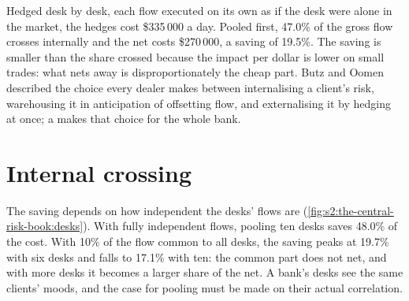 Hedged desk by desk, each flow executed on its own as if the desk were alone in the market, the hedges cost \$335\,000 a day. Pooled first, 47.0\% of the
gross flow crosses internally and the net costs \$270\,000, a saving of 19.5\%. The saving is smaller than the share crossed because the impact per
dollar is lower on small trades: what nets away is disproportionately the cheap part. Butz and Oomen described the choice every dealer makes between
internalising a client's risk, warehousing it in anticipation of offsetting flow, and externalising it by hedging at once; a  makes
that choice for the whole bank.

\section{Internal crossing}

The saving depends on how independent the desks' flows are (\cref{fig:s2:the-central-risk-book:desks}). With fully independent flows, pooling ten desks
saves 48.0\% of the cost. With 10\% of the flow common to all desks, the saving peaks at 19.7\% with six desks and falls to 17.1\% with ten: the common
part does not net, and with more desks it becomes a larger share of the net. A bank's desks see the same clients' moods, and the case for pooling must
be made on their actual correlation.

\begin{omfigure}

\label{fig:s2:the-central-risk-book:desks}
\end{omfigure}

